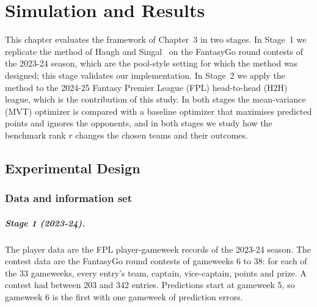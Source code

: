 \documentclass[12pt,oneside,a4paper]{book}
\theoremstyle{definition}
\theoremstyle{remark}
\begin{document}
		\providecommand{\tbd}[1]{\textbf{[TBD: #1]}}



	\providecommand{\tbd}[1]{\textbf{[TBD: #1]}}

	\chapter{Simulation and Results}
	\label{ch:results}

	This chapter evaluates the framework of Chapter~3 in two stages. In Stage~1 we replicate the
	method of Haugh and Singal~\cite{haugh2021} on the FantasyGo round contests of the 2023-24
	season, which are the pool-style setting for which the method was designed; this stage
	validates our implementation. In Stage~2 we apply the method to the 2024-25 Fantasy Premier
	League (FPL) head-to-head (H2H) league, which is the contribution of this study. In both stages
	the mean-variance (MVT) optimizer is compared with a baseline optimizer that maximises
	predicted points and ignores the opponents, and in both stages we study how the benchmark
	rank $r$ changes the chosen teams and their outcomes.

	\section{Experimental Design}
	\label{sec:design}

	\subsection{Data and information set}
	\label{sec:design-data}

	\paragraph{Stage 1 (2023-24).} The player data are the FPL player-gameweek records of the
	2023-24 season. The contest data are the FantasyGo round contests of gameweeks 6 to 38: for
	each of the 33 gameweeks, every entry's team, captain, vice-captain, points and prize. A contest
	had between 203 and 342 entries. Predictions start at gameweek 5, so gameweek 6 is the first
	with one gameweek of prediction errors.
\end{document}
